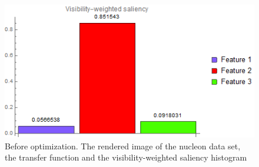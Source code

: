 \begin{figure}
\begin{minipage}{.2\textwidth}
	\end{minipage}~
	\begin{minipage}{.4\textwidth}
		\includegraphics[width=1\linewidth]{images/nucleon_strong_red_visibility_saliency_weighted_chart}
	\end{minipage}
	\caption{Before optimization. The rendered image of the nucleon data set, the transfer function and the visibility-weighted saliency histogram}
	\label{fig:nucleon_strong_red}
\end{figure}

